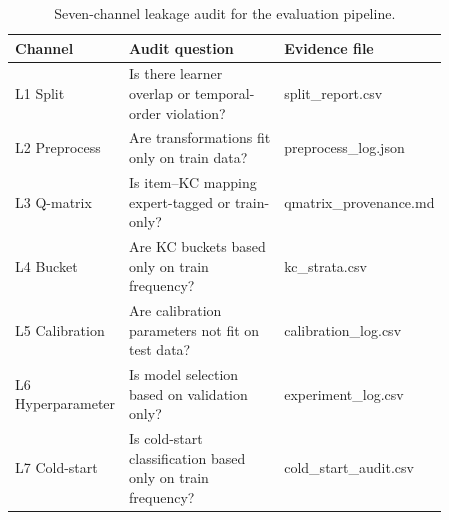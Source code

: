 \begin{table}[t]
\centering
\caption{Seven-channel leakage audit for the evaluation pipeline.}
\label{tab:leakage}
\footnotesize
\begin{tabular}{p{0.16\linewidth}p{0.48\linewidth}p{0.22\linewidth}}
\toprule
Channel & Audit question & Evidence file \\
\midrule
L1 Split & Is there learner overlap or temporal-order violation? & split\_report.csv \\
L2 Preprocess & Are transformations fit only on train data? & preprocess\_log.json \\
L3 Q-matrix & Is item--KC mapping expert-tagged or train-only? & qmatrix\_provenance.md \\
L4 Bucket & Are KC buckets based only on train frequency? & kc\_strata.csv \\
L5 Calibration & Are calibration parameters not fit on test data? & calibration\_log.csv \\
L6 Hyperparameter & Is model selection based on validation only? & experiment\_log.csv \\
L7 Cold-start & Is cold-start classification based only on train frequency? & cold\_start\_audit.csv \\
\bottomrule
\end{tabular}
\end{table}
